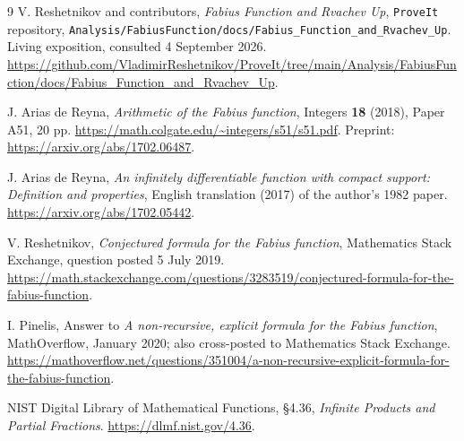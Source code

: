 \documentclass[11pt,a4paper]{article}
\theoremstyle{definition}
\theoremstyle{remark}
\begin{document}
\begin{thebibliography}{9}
V. Reshetnikov and contributors,
\emph{Fabius Function and Rvachev Up}, \texttt{ProveIt} repository,
\texttt{Analysis/FabiusFunction/docs/Fabius\_Function\_and\_Rvachev\_Up}.
Living exposition, consulted 4 September 2026.
\url{https://github.com/VladimirReshetnikov/ProveIt/tree/main/Analysis/FabiusFunction/docs/Fabius_Function_and_Rvachev_Up}.

J. Arias de Reyna,
\emph{Arithmetic of the Fabius function},
Integers \textbf{18} (2018), Paper A51, 20 pp.
\url{https://math.colgate.edu/~integers/s51/s51.pdf}.
Preprint: \url{https://arxiv.org/abs/1702.06487}.

J. Arias de Reyna,
\emph{An infinitely differentiable function with compact support:
Definition and properties}, English translation (2017) of the author's 1982 paper.
\url{https://arxiv.org/abs/1702.05442}.

V. Reshetnikov,
\emph{Conjectured formula for the Fabius function},
Mathematics Stack Exchange, question posted 5 July 2019.
\url{https://math.stackexchange.com/questions/3283519/conjectured-formula-for-the-fabius-function}.

I. Pinelis,
Answer to \emph{A non-recursive, explicit formula for the Fabius function},
MathOverflow, January 2020; also cross-posted to Mathematics Stack Exchange.
\url{https://mathoverflow.net/questions/351004/a-non-recursive-explicit-formula-for-the-fabius-function}.

NIST Digital Library of Mathematical Functions,
\S4.36, \emph{Infinite Products and Partial Fractions}.
\url{https://dlmf.nist.gov/4.36}.
\end{thebibliography}
\end{document}
